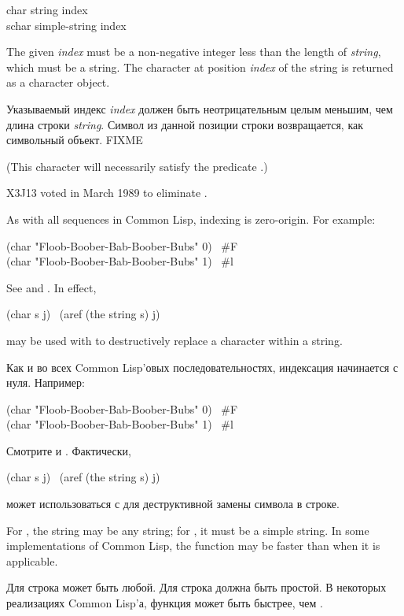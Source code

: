 \begin{defun}[Function]
char string index \\
schar simple-string index

The given \emph{index} must be a non-negative integer less than
the length of \emph{string}, which must be a
string.  The character at position \emph{index}
of the string is returned as a character object.

Указываемый индекс \emph{index} должен быть неотрицательным целым меньшим, чем длина
строки \emph{string}. Символ из данной позиции строки возвращается, как символьный
объект. FIXME
\begin{obsolete}
(This character will necessarily satisfy the predicate .)
\end{obsolete}
\begin{newer}
X3J13 voted in March 1989 
to eliminate .
\end{newer}
As with all sequences in Common Lisp, indexing is zero-origin.
For example:
\begin{lisp}
(char "Floob-Boober-Bab-Boober-Bubs" 0) \EV\ \#{\Xbackslash}F \\
(char "Floob-Boober-Bab-Boober-Bubs" 1) \EV\ \#{\Xbackslash}l
\end{lisp}
See  and .  In effect,
\begin{lisp}
(char s j) \EQ\ (aref (the string s) j)
\end{lisp}
 may be used with  to destructively replace
a character within a string.

Как и во всех Common Lisp'овых последовательностях, индексация начинается с
нуля.
Например:
\begin{lisp}
(char "Floob-Boober-Bab-Boober-Bubs" 0) \EV\ \#{\Xbackslash}F \\
(char "Floob-Boober-Bab-Boober-Bubs" 1) \EV\ \#{\Xbackslash}l
\end{lisp}
Смотрите  и . Фактически, 
\begin{lisp}
(char s j) \EQ\ (aref (the string s) j)
\end{lisp}
 может использоваться с  для деструктивной замены символа в
строке.

For , the string may be any string;
for , it must be a simple string.
In some implementations of Common Lisp, the function  may
be faster than  when it is applicable.

Для  строка может быть любой.
Для  строка должна быть простой.
В некоторых реализациях Common Lisp'а, функция  может быть быстрее,
чем .
\end{defun}

